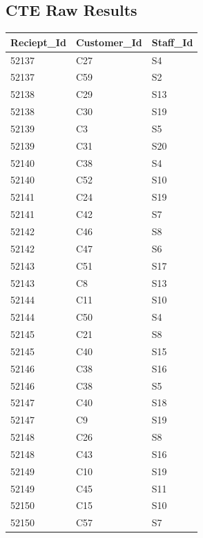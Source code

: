 \documentclass{article}
\begin{document}
    \subsection{CTE Raw Results}
    \label{sec:CTEResults}
    \begin{table}[H]
        \centering
        \begin{tabular}{|l|l|l|}
        \hline
        Reciept\_Id & Customer\_Id & Staff\_Id \\ \hline
        52137       & C27          & S4        \\ \hline
        52137       & C59          & S2        \\ \hline
        52138       & C29          & S13       \\ \hline
        52138       & C30          & S19       \\ \hline
        52139       & C3           & S5        \\ \hline
        52139       & C31          & S20       \\ \hline
        52140       & C38          & S4        \\ \hline
        52140       & C52          & S10       \\ \hline
        52141       & C24          & S19       \\ \hline
        52141       & C42          & S7        \\ \hline
        52142       & C46          & S8        \\ \hline
        52142       & C47          & S6        \\ \hline
        52143       & C51          & S17       \\ \hline
        52143       & C8           & S13       \\ \hline
        52144       & C11          & S10       \\ \hline
        52144       & C50          & S4        \\ \hline
        52145       & C21          & S8        \\ \hline
        52145       & C40          & S15       \\ \hline
        52146       & C38          & S16       \\ \hline
        52146       & C38          & S5        \\ \hline
        52147       & C40          & S18       \\ \hline
        52147       & C9           & S19       \\ \hline
        52148       & C26          & S8        \\ \hline
        52148       & C43          & S16       \\ \hline
        52149       & C10          & S19       \\ \hline
        52149       & C45          & S11       \\ \hline
        52150       & C15          & S10       \\ \hline
        52150       & C57          & S7        \\ \hline
        \end{tabular}
    \end{table}
\end{document}
